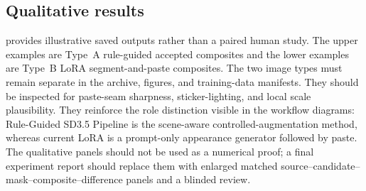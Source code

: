 \documentclass[11pt,a4paper]{article}
\begin{document}
\subsection{Qualitative results}\label{sec:qual}
 provides illustrative saved outputs rather than a paired human
study. The upper examples are Type~A rule-guided accepted composites and the lower examples are Type~B LoRA segment-and-paste composites. The two image types must remain separate in the archive, figures, and training-data manifests. They should be inspected for paste-seam
sharpness, sticker-lighting, and local scale plausibility. They reinforce the role distinction visible in the workflow diagrams: Rule-Guided SD3.5 Pipeline is the scene-aware controlled-augmentation method, whereas current LoRA is a prompt-only appearance generator followed by paste. The qualitative panels should not be used as a numerical proof; a final experiment report should replace them with enlarged matched source--candidate--mask--composite--difference panels and a blinded review.
\end{document}

